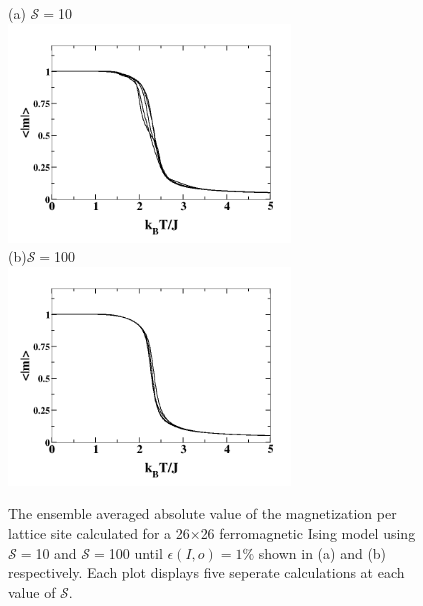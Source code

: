 \documentclass[aps,prl,reprint,superscriptaddress,showkeys]{revtex4-1}
\begin{document}
\begin{figure}
(a)\hspace{0.1cm} $\mathcal{S}=$10\\
\includegraphics[width=7.5cm]{M_vs_T_S10.png}\\
(b)\hspace{0.1cm}$\mathcal{S}=$100\\
\includegraphics[width=7.5cm]{M_vs_T_S100.png}
\caption{\label{avg_mag} The ensemble averaged absolute value of the magnetization per lattice site calculated for a 26$\times$26 ferromagnetic Ising model  using $\mathcal{S}=$10 and $\mathcal{S}=$100 until $\epsilon(I,o)=1\%$ shown in (a) and (b) respectively. Each plot displays five seperate calculations at each value of $\mathcal{S}$.  }
\end{figure}
\end{document}
